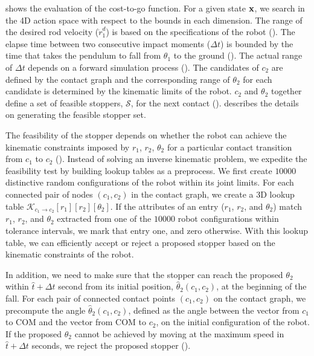 shows the evaluation of the cost-to-go
function. For a given state $\mathbf{x}$, we search in the 4D action space
with respect to the bounds in each dimension. The range of the desired
rod velocity ($\dot{r}^d_1$) is based on the specifications of the robot
(). The elapse time between two consecutive impact
moments ($\Delta t$) is bounded by the time that takes the pendulum to
fall from $\theta_1$ to the ground ().  The actual
range of $\Delta t$ depends on a forward simulation process
(). The candidates of $c_2$ are defined by the contact
graph and the corresponding range of $\theta_2$ for each candidate is
determined by the kinematic limits of the robot. $c_2$ and $\theta_2$
together define a set of feasible stoppers, $\mathcal{S}$, for the
next contact ().  describes the
details on generating the feasible stopper set.

The feasibility of the stopper depends on whether the robot can
achieve the kinematic constraints imposed by $r_1$, $r_2$, $\theta_2$
for a particular contact transition from $c_1$ to $c_2$
().  Instead of solving an inverse kinematic
problem, we expedite the feasibility test by building lookup tables as
a preprocess. We first create $10000$ distinctive random
configurations of the robot within its joint limits. For each
connected pair of nodes $(c_1, c_2)$ in the contact graph, we create a
3D lookup table
$\mathcal{K}_{c_1\rightarrow c_2}[r_1][r_2][\theta_2]$. If the
attributes of an entry (\ie $r_1$, $r_2$, and $\theta_2$) match $r_1$,
$r_2$, and $\theta_2$ extracted from one of the $10000$ robot
configurations within tolerance intervals, we mark that entry one, and
zero otherwise. With this lookup table, we can efficiently accept or
reject a proposed stopper based on the kinematic constraints of the
robot.

In addition, we need to make sure that the stopper can reach the
proposed $\theta_2$ within $\hat{t} +\Delta t$ second from its initial
position, $\hat{\theta}_{2}(c_1,c_2)$, at the beginning of the
fall. For each pair of connected contact points $(c_1, c_2)$ on the
contact graph, we precompute the angle $\hat{\theta}_{2}(c_1,c_2)$,
defined as the angle between the vector from $c_1$ to COM and the
vector from COM to $c_2$, on the initial configuration of the robot.
If the proposed $\theta_2$ cannot be achieved by moving at the maximum
speed in $\hat{t} +\Delta t$ seconds, we reject the proposed stopper
().



